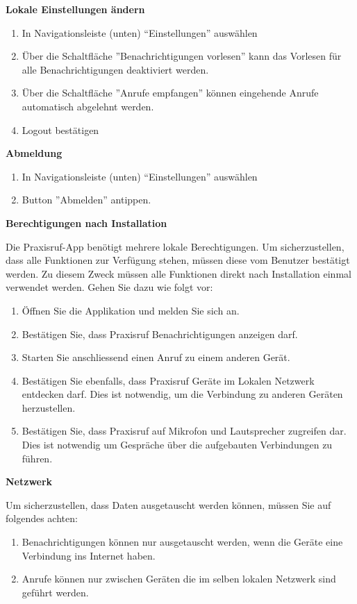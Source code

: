 \textbf{Lokale Einstellungen ändern}
\begin{enumerate}
    \item In Navigationsleiste (unten) ``Einstellungen'' auswählen
    \item Über die Schaltfläche ''Benachrichtigungen vorlesen'' kann das Vorlesen für alle Benachrichtigungen deaktiviert werden.
    \item Über die Schaltfläche ''Anrufe empfangen'' können eingehende Anrufe automatisch abgelehnt werden.
    \item Logout bestätigen
\end{enumerate}

\textbf{Abmeldung}

\begin{enumerate}
    \item In Navigationsleiste (unten) ``Einstellungen'' auswählen
    \item Button ''Abmelden'' antippen.
\end{enumerate}

\textbf{Berechtigungen nach Installation}

Die Praxisruf-App benötigt mehrere lokale Berechtigungen.
Um sicherzustellen, dass alle Funktionen zur Verfügung stehen, müssen diese vom Benutzer bestätigt werden.
Zu diesem Zweck müssen alle Funktionen direkt nach Installation einmal verwendet werden.
Gehen Sie dazu wie folgt vor:

\begin{enumerate}
    \item Öffnen Sie die Applikation und melden Sie sich an.
    \item Bestätigen Sie, dass Praxisruf Benachrichtigungen anzeigen darf.
    \item Starten Sie anschliessend einen Anruf zu einem anderen Gerät.
    \item Bestätigen Sie ebenfalls, dass Praxisruf Geräte im Lokalen Netzwerk entdecken darf.
    Dies ist notwendig, um die Verbindung zu anderen Geräten herzustellen.
    \item Bestätigen Sie, dass Praxisruf auf Mikrofon und Lautsprecher zugreifen dar.
    Dies ist notwendig um Gespräche über die aufgebauten Verbindungen zu führen.
\end{enumerate}

\textbf{Netzwerk}

Um sicherzustellen, dass Daten ausgetauscht werden können, müssen Sie auf folgendes achten:

\begin{enumerate}
    \item Benachrichtigungen können nur ausgetauscht werden, wenn die Geräte eine Verbindung ins Internet haben.
    \item Anrufe können nur zwischen Geräten die im selben lokalen Netzwerk sind geführt werden.
\end{enumerate}


